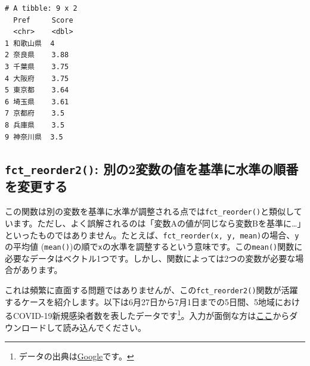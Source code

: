 \documentclass[
  a4paper,
  pandoc,
  ja=standard,
  jafont=haranoaji]{bxjsbook}
\begin{document}
\begin{verbatim}
# A tibble: 9 x 2
  Pref     Score
  <chr>    <dbl>
1 和歌山県  4   
2 奈良県    3.88
3 千葉県    3.75
4 大阪府    3.75
5 東京都    3.64
6 埼玉県    3.61
7 京都府    3.5 
8 兵庫県    3.5 
9 神奈川県  3.5 
\end{verbatim}

\hypertarget{factor-forcat-reorder2}{%
\subsection{\texorpdfstring{\texttt{fct\_reorder2()}:
別の2変数の値を基準に水準の順番を変更する}{fct\_reorder2(): 別の2変数の値を基準に水準の順番を変更する}}\label{factor-forcat-reorder2}}

この関数は別の変数を基準に水準が調整される点では\texttt{fct\_reorder()}と類似しています。ただし、よく誤解されるのは「変数Aの値が同じなら変数Bを基準に\ldots」といったものではありません。たとえば、\texttt{fct\_reorder(x,\ y,\ mean)}の場合、\texttt{y}の平均値
(\texttt{mean()})の順で\texttt{x}の水準を調整するという意味です。この\texttt{mean()}関数に必要なデータはベクトル1つです。しかし、関数によっては2つの変数が必要な場合があります。

これは頻繁に直面する問題ではありませんが、この\texttt{fct\_reorder2()}関数が活躍するケースを紹介します。以下は6月27日から7月1日までの5日間、5地域におけるCOVID-19新規感染者数を表したデータです\footnote{データの出典は\href{https://news.google.com/covid19/map}{Google}です。}。入力が面倒な方は\href{Data/COVID19.csv}{ここ}からダウンロードして読み込んでください。
\end{document}
